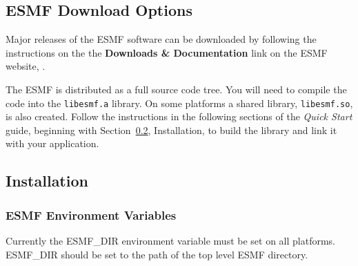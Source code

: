 
\subsection{ESMF Download Options}

Major releases of the ESMF software can be downloaded by following
the instructions on the 
the {\bf Downloads \& Documentation} link on the ESMF 
website, .

The ESMF is distributed as a full source code tree.  You will need
to compile the code into the {\tt libesmf.a} library.
On some platforms a shared library, {\tt libesmf.so}, is also created.
Follow the instructions in the following sections of the 
{\it Quick Start} guide, beginning with Section~\ref{InstallProcedures},
Installation, to build the library and link it with your application.

\subsection{Installation}
\label{InstallProcedures}



\subsubsection{ESMF Environment Variables}
\label{EnvironmentVariables}

Currently the ESMF\_DIR environment variable must be set on all
platforms.  ESMF\_DIR should be set to the path of the top
level ESMF directory.  

